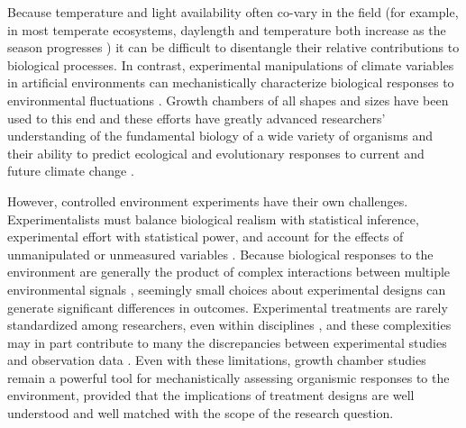 \documentclass[11pt]{article}
\begin{document}
\noindent Because temperature and light availability often co-vary in the field (for example, in most temperate ecosystems, daylength and temperature both increase as the season progresses \citep{Rosenberg1974}) it can be difficult to disentangle their relative contributions to biological processes. In contrast, experimental manipulations of climate variables in artificial environments can mechanistically characterize biological responses to environmental fluctuations \citep{Ettinger:2020aa,Primack2015}. Growth chambers of all shapes and sizes have been used to this end \citep{Downs:1980us} and these efforts have greatly advanced researchers' understanding of the fundamental biology of a wide variety of organisms and their ability to predict ecological and evolutionary responses to current and future climate change \citep{Stewart:2013wz}.

However, controlled environment experiments have their own challenges. Experimentalists must balance biological realism with statistical inference, experimental effort with statistical power, and account for the effects of unmanipulated or unmeasured variables \citep{schneiner2001}. Because biological responses to the environment are generally the product of complex interactions between multiple environmental signals \citep{Casal:2002vz}, seemingly small choices about experimental designs can generate significant differences in outcomes. Experimental treatments are rarely standardized among researchers, even within disciplines \citep{limitingcues}, and these complexities may in part contribute to many the discrepancies between experimental studies and observation data \citep{Poorter:2016aa}. Even with these limitations, growth chamber studies remain a powerful tool for mechanistically assessing organismic responses to the environment, provided that the implications of treatment designs are well understood and well matched with the scope of the research question. 
\end{document}
